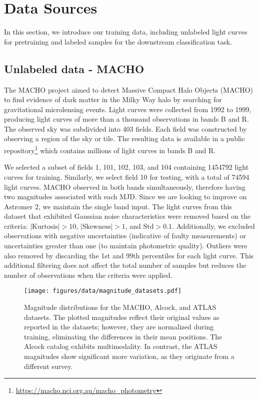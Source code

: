 \section{Data Sources}\label{sec:data}
In this section, we introduce our training data, including unlabeled light curves for pretraining and labeled samples for the downstream classification task. 

\subsection{Unlabeled data - MACHO}
The MACHO project \citep{1993Natur.365..621A} aimed to detect Massive Compact Halo Objects (MACHO) to find evidence of dark matter in the Milky Way halo by searching for gravitational microlensing events. Light curves were collected from 1992 to 1999, producing light curves of more than a thousand observations \citep{1999PASP..111.1539A} in bands B and R.
The observed sky was subdivided into 403 fields. Each field was constructed by observing a region of the sky or tile. The resulting data is available in a public repository\footnote{\url{https://macho.nci.org.au/macho_photometry}} which contains millions of light curves in bands B and R. 

We selected a subset of fields 1, 101, 102, 103, and 104 containing \num{1454792} light curves for training. Similarly, we select field 10 for testing, with a total of \num{74594} light curves. MACHO observed in both bands simultaneously, therefore having two magnitudes associated with each MJD. Since we are looking to improve on Astromer 2, we maintain the single band input.  The light curves from this dataset that exhibited Gaussian noise characteristics were removed based on the criteria: $|\text{Kurtosis}| > 10$, $|\text{Skewness}| > 1$, and $\text{Std} > 0.1$. Additionally, we excluded observations with negative uncertainties (indicative of faulty measurements) or uncertainties greater than one (to maintain photometric quality). Outliers were also removed by discarding the 1st and 99th percentiles for each light curve. This additional filtering does not affect the total number of samples but reduces the number of observations when the criteria were applied.

\begin{figure}
    \centering
    \texttt{[image: figures/data/magnitude\_datasets.pdf]}
    \caption{Magnitude distributions for the MACHO, Alcock, and ATLAS datasets. The plotted magnitudes reflect their original values as reported in the datasets; however, they are normalized during training, eliminating the differences in their mean positions.
    The Alcock catalog exhibits multimodality. In contrast, the ATLAS magnitudes show significant more variation, as they originate from a different survey.}
    \label{fig:macho-alcock-magn}
\end{figure}

